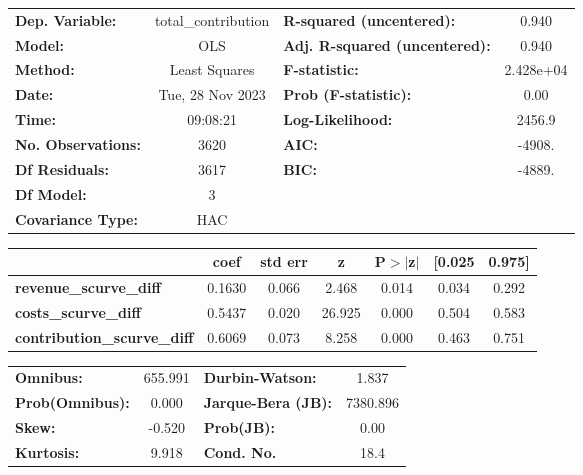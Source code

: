 \begin{center}
\begin{tabular}{lclc}
\toprule
\textbf{Dep. Variable:}             & total\_contribution & \textbf{  R-squared (uncentered):}      &     0.940   \\
\textbf{Model:}                     &         OLS         & \textbf{  Adj. R-squared (uncentered):} &     0.940   \\
\textbf{Method:}                    &    Least Squares    & \textbf{  F-statistic:       }          & 2.428e+04   \\
\textbf{Date:}                      &   Tue, 28 Nov 2023  & \textbf{  Prob (F-statistic):}          &     0.00    \\
\textbf{Time:}                      &       09:08:21      & \textbf{  Log-Likelihood:    }          &    2456.9   \\
\textbf{No. Observations:}          &          3620       & \textbf{  AIC:               }          &    -4908.   \\
\textbf{Df Residuals:}              &          3617       & \textbf{  BIC:               }          &    -4889.   \\
\textbf{Df Model:}                  &             3       & \textbf{                     }          &             \\
\textbf{Covariance Type:}           &         HAC         & \textbf{                     }          &             \\
\bottomrule
\end{tabular}
\begin{tabular}{lcccccc}
                                    & \textbf{coef} & \textbf{std err} & \textbf{z} & \textbf{P$> |$z$|$} & \textbf{[0.025} & \textbf{0.975]}  \\
\midrule
\textbf{revenue\_scurve\_diff}      &       0.1630  &        0.066     &     2.468  &         0.014        &        0.034    &        0.292     \\
\textbf{costs\_scurve\_diff}        &       0.5437  &        0.020     &    26.925  &         0.000        &        0.504    &        0.583     \\
\textbf{contribution\_scurve\_diff} &       0.6069  &        0.073     &     8.258  &         0.000        &        0.463    &        0.751     \\
\bottomrule
\end{tabular}
\begin{tabular}{lclc}
\textbf{Omnibus:}       & 655.991 & \textbf{  Durbin-Watson:     } &    1.837  \\
\textbf{Prob(Omnibus):} &   0.000 & \textbf{  Jarque-Bera (JB):  } & 7380.896  \\
\textbf{Skew:}          &  -0.520 & \textbf{  Prob(JB):          } &     0.00  \\
\textbf{Kurtosis:}      &   9.918 & \textbf{  Cond. No.          } &     18.4  \\
\bottomrule
\end{tabular}
\end{center}